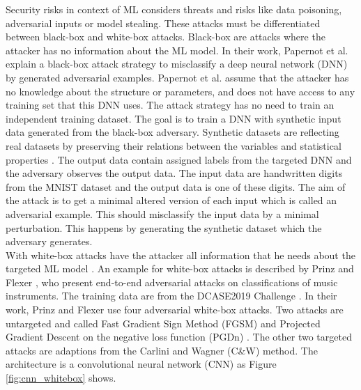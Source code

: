 Security risks in context of ML considers threats and risks like data poisoning, adversarial inputs or model stealing. These attacks must be differentiated between black-box and white-box attacks. Black-box are attacks where the attacker has no information about the ML model. In their work, Papernot et al. \cite{DBLP:conf/ccs/PapernotMGJCS17} explain a black-box attack strategy to misclassify a deep neural network (DNN) by generated adversarial examples. Papernot et al. assume that the attacker has no knowledge about the structure or parameters, and does not have access to any training set that this DNN uses. The attack strategy has no need to train an independent training dataset. The goal is to train a DNN with synthetic input data generated from the black-box adversary. Synthetic datasets are reflecting real datasets by preserving their relations between the variables and statistical properties \cite{Quintana2020ASD}. The output data contain assigned labels from the targeted DNN and the adversary observes the output data. The input data are handwritten digits from the MNIST dataset and the output data is one of these digits. The aim of the attack is to get a minimal altered version of each input which is called an adversarial example. This should misclassify the input data by a minimal perturbation. This happens by generating the synthetic dataset which the adversary generates. \\
With white-box attacks have the attacker all information that he needs about the targeted ML model \cite{tabassi2019taxonomy}. An example for white-box attacks is described by
Prinz and Flexer \cite{DBLP:journals/corr/abs-2007-14714}, who present end-to-end adversarial attacks on classifications of music instruments. The training data are from the DCASE2019 Challenge \cite{DBLP:conf/dcase/FonsecaPFES19}. In their work, Prinz and Flexer use four adversarial white-box attacks. Two attacks are untargeted and called Fast Gradient Sign Method (FGSM) \cite{DBLP:journals/corr/GoodfellowSS14} and Projected Gradient Descent on the negative loss function (PGDn) \cite{DBLP:conf/iclr/MadryMSTV18}. The other two targeted attacks are adaptions from the Carlini and Wagner (C\&W) \cite{DBLP:conf/sp/Carlini018} method. The architecture is a convolutional neural network (CNN) \cite{DBLP:journals/corr/Kim14f} as Figure \ref{fig:cnn_whitebox} shows.

